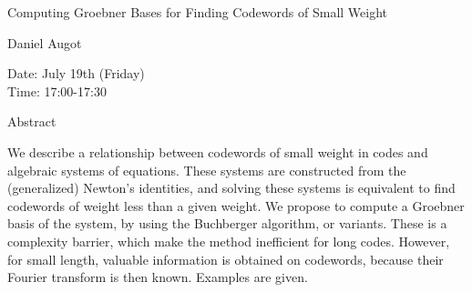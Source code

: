 \begin{center}
\LARGE
Computing Groebner Bases for Finding Codewords of Small
                             Weight 
\end{center}

\begin{center}
\Large
Daniel Augot
\end{center}

\noindent
Date: July 19th (Friday)\\
Time:  17:00-17:30\\

\begin{center}
\large
Abstract
\end{center}

We describe a relationship between codewords of small weight in codes and algebraic systems of
equations. These systems are constructed from the (generalized) Newton's identities, and solving
these systems is equivalent to find codewords of weight less than a given weight. We propose to
compute a Groebner basis of the system, by using the Buchberger algorithm, or variants. These is a
complexity barrier, which make the method inefficient for long codes. However, for small length,
valuable information is obtained on codewords, because their Fourier transform is then known.
Examples are given. 

